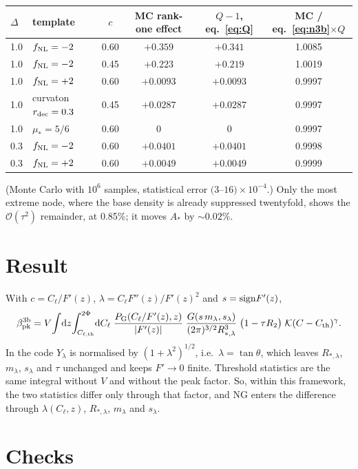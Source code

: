\documentclass[11pt]{article}
\newcommand{\Cl}{C_{\ell}}
\newcommand{\dd}{\mathrm{d}}
\begin{document}
\begin{center}
\begin{tabular}{llcccc}
$\Delta$ & template & $c$ & MC rank-one effect & $Q-1$, eq.~\eqref{eq:Q} & MC / eq.~\eqref{eq:n3b}$\times Q$\\\hline
1.0 & $f_{\rm NL}=-2$ & 0.60 & $+0.359$ & $+0.341$ & 1.0085\\
1.0 & $f_{\rm NL}=-2$ & 0.45 & $+0.223$ & $+0.219$ & 1.0019\\
1.0 & $f_{\rm NL}=+2$ & 0.60 & $+0.0093$ & $+0.0093$ & 0.9997\\
1.0 & curvaton $r_{\rm dec}=0.3$ & 0.45 & $+0.0287$ & $+0.0287$ & 0.9997\\
1.0 & $\mu_*=5/6$ & 0.60 & $0$ & $0$ & 0.9997\\
0.3 & $f_{\rm NL}=-2$ & 0.60 & $+0.0401$ & $+0.0401$ & 0.9998\\
0.3 & $f_{\rm NL}=+2$ & 0.60 & $+0.0049$ & $+0.0049$ & 0.9999\\
\end{tabular}
\end{center}
(Monte Carlo with $10^6$ samples, statistical error $(3$--$16)\times10^{-4}$.) Only the most
extreme node, where the base density is already suppressed twentyfold, shows the
$\mathcal O(\tau^2)$ remainder, at 0.85\%; it moves $A_*$ by $\sim0.02\%$.

\section{Result}

With $c=\Cl/F'(z)$, $\lambda=\Cl F''(z)/F'(z)^2$ and $s={\rm sign}F'(z)$,
\begin{equation}
\beta^{\rm 3b}_{\rm pk}=V\!\int\!\dd z\!\int_{C_{\ell,\rm th}}^{2\Phi}\!\dd\Cl\;
\frac{P_{\rm G}(\Cl/F'(z),z)}{|F'(z)|}\;
\frac{G(s\,m_\lambda,s_\lambda)}{(2\pi)^{3/2}R_{*,\lambda}^3}\;\big(1-\tau R_2\big)\;
\mathcal K(C-C_{\rm th})^\gamma .
\label{eq:final}
\end{equation}
In the code $Y_\lambda$ is normalised by $(1+\lambda^2)^{1/2}$, i.e.\ $\lambda=\tan\theta$, which leaves
$R_{*,\lambda}$, $m_\lambda$, $s_\lambda$ and $\tau$ unchanged and keeps $F'\to0$ finite.
Threshold statistics are the same integral without $V$ and without the peak factor. So,
within this framework, the two statistics differ only through that factor, and NG enters the
difference through $\lambda(\Cl,z)$, $R_{*,\lambda}$, $m_\lambda$ and $s_\lambda$.

\section{Checks}
\end{document}
